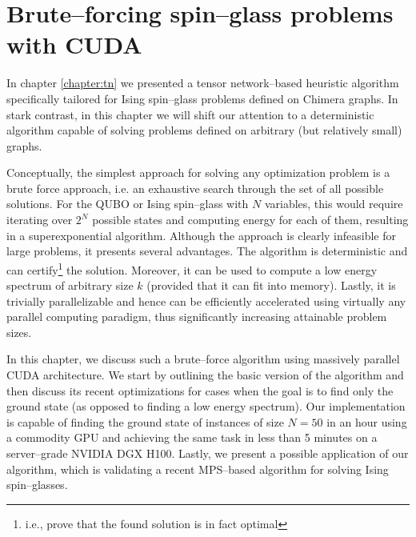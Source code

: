\chapter[Brute--forcing spin--glass problems]{Brute--forcing spin--glass problems with CUDA}
\label{chapter:bruteforce}
In chapter \ref{chapter:tn} we presented a tensor network--based heuristic algorithm specifically
tailored for Ising spin--glass problems defined on Chimera graphs. In stark contrast, in this
chapter we will shift our attention to a deterministic algorithm capable of solving problems defined
on arbitrary (but relatively small) graphs.

Conceptually, the simplest approach for solving any optimization problem is a
brute force approach, i.e. an exhaustive search through the set of all possible
solutions. For the QUBO or Ising spin--glass with $N$ variables, this would
require iterating over $2^{N}$ possible states and computing energy for each of
them, resulting in a superexponential algorithm. Although the approach is
clearly infeasible for large problems, it presents several advantages. The
algorithm is deterministic and can certify\footnote{i.e., prove that the found
  solution is in fact optimal} the solution. Moreover, it can be used to compute
a low energy spectrum of arbitrary size $k$ (provided that it can fit into
memory). Lastly, it is trivially parallelizable and hence can be efficiently
accelerated using virtually any parallel computing paradigm, thus significantly
increasing attainable problem sizes.

In this chapter, we discuss such a brute--force algorithm using massively
parallel CUDA architecture. We start by outlining the basic version of the
algorithm and then discuss its recent optimizations for cases when the goal is
to find only the ground state (as opposed to finding a low energy spectrum).
Our implementation is capable of finding the ground state of instances of size
$N=50$ in an hour using a commodity GPU and achieving the same task in less
than 5 minutes on a server--grade NVIDIA DGX H100. Lastly, we present a
possible application of our algorithm, which is validating a recent MPS--based
algorithm for solving Ising spin--glasses.


